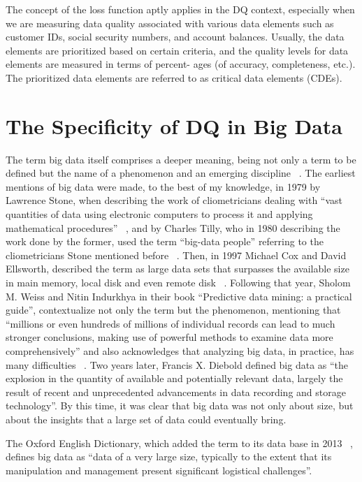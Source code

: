 The concept of the loss function aptly applies in the DQ context, especially when we are measuring data quality associated with various data
elements such as customer IDs, social security numbers, and account balances. Usually, the data elements are prioritized based on certain criteria,
and the quality levels for data elements are measured in terms of percent-
ages (of accuracy, completeness, etc.). The prioritized data elements are
referred to as critical data elements (CDEs).


\section{The Specificity of DQ in Big Data}

The term big data itself comprises a deeper meaning, being not only a term to be
defined but the name of a phenomenon and an emerging discipline ~\cite{Diebold2012}. 
The earliest mentions of big data were made, to the best of my knowledge, in 1979 by Lawrence
Stone, when describing the work of cliometricians dealing with “vast quantities of data
using electronic computers to process it and applying mathematical procedures” ~\cite{Lawrence1979},
and by Charles Tilly, who in 1980 describing the work done by the former, used the
term “big-data people” referring to the cliometricians Stone mentioned before ~\cite{Tilly1980}.
Then, in 1997 Michael Cox and David Ellsworth, described the term as large data
sets that surpasses the available size in main memory, local disk and even remote disk
~\cite{Cox1997}. Following that year, Sholom M. Weiss and Nitin Indurkhya in their book “Predictive data mining: a practical guide”, contextualize not only the term but the phenomenon, 
mentioning that “millions or even hundreds of millions of individual records can lead to much stronger conclusions, making use of powerful methods to examine
data more comprehensively” and also acknowledges that analyzing big data, in practice, has many difficulties ~\cite{Sholom1998}. Two years later, Francis X. Diebold defined big data
as “the explosion in the quantity of available and potentially relevant data, largely the
result of recent and unprecedented advancements in data recording and storage technology”. By this time, it was clear that big data was not only about size, but about
the insights that a large set of data could eventually bring.

The Oxford English Dictionary, which added the term to its data base in 2013
~\cite{OxfordDictionaries2013}, defines big data as “data of a very large size, typically to the extent that its
manipulation and management present significant logistical challenges”.

